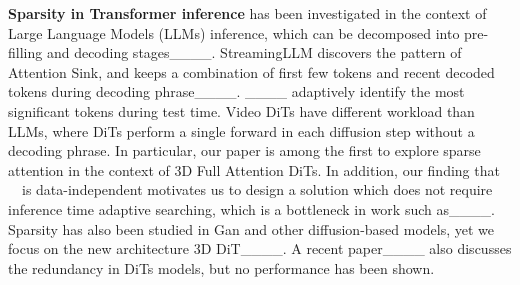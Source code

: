 \textbf{Sparsity in Transformer inference} has been investigated in the context of Large Language Models (LLMs) inference, which can be decomposed into pre-filling and decoding stages____. StreamingLLM discovers the pattern of Attention Sink, and keeps a combination of first few tokens and recent decoded tokens during decoding phrase____. ____ adaptively identify the most significant tokens during test time. Video DiTs have different workload than LLMs, where DiTs perform a single forward in each diffusion step without a decoding phrase. In particular, our paper is among the first to explore sparse attention in the context of 3D Full Attention DiTs. In addition, our finding that ~\patternname~is data-independent motivates us to design a solution which does not require inference time adaptive searching, which is a bottleneck in work such as____. Sparsity has also been studied in Gan and other diffusion-based models, yet we focus on the new architecture 3D DiT____. A recent paper____ also discusses the redundancy in DiTs models, but no performance has been shown.%





